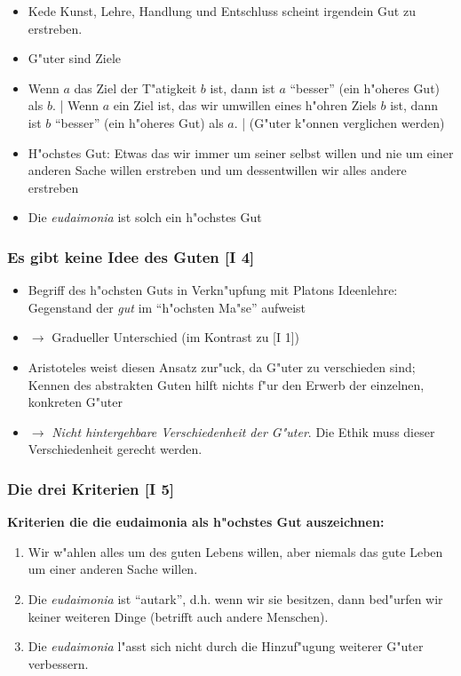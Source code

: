 \documentclass[emulatestandardclasses]{scrartcl}
\begin{document}
\begin{itemize}
  \item Kede Kunst, Lehre, Handlung und Entschluss scheint irgendein Gut zu erstreben.
  \item G"uter sind Ziele
  \item Wenn $a$ das Ziel der T"atigkeit $b$ ist, dann ist $a$ "`besser"' (ein h"oheres Gut) als $b$. | Wenn $a$ ein Ziel ist, das wir umwillen eines h"ohren Ziels $b$ ist, dann ist $b$ "`besser"' (ein h"oheres Gut) als $a$.  | (G"uter k"onnen verglichen werden)
  \item H"ochstes Gut: Etwas das wir immer um seiner selbst willen und nie um einer anderen Sache willen erstreben und um dessentwillen wir alles andere erstreben
  \item Die \emph{eudaimonia} ist solch ein h"ochstes Gut
\end{itemize}

\subsubsection{Es gibt keine Idee des Guten [I 4]}

\begin{itemize}
  \item Begriff des h"ochsten Guts in Verkn"upfung mit Platons Ideenlehre: Gegenstand der \emph{gut} im "`h"ochsten Ma"se"' aufweist
  \item $\rightarrow$ Gradueller Unterschied (im Kontrast zu [I 1])
  \item Aristoteles weist diesen Ansatz zur"uck, da G"uter zu verschieden sind; Kennen des abstrakten Guten hilft nichts f"ur den Erwerb der einzelnen, konkreten G"uter
  \item $\rightarrow$ \emph{Nicht hintergehbare Verschiedenheit der G"uter}. Die Ethik muss dieser Verschiedenheit gerecht werden.
\end{itemize}

\subsubsection{Die drei Kriterien [I 5]}

\noindent \textbf{Kriterien die die eudaimonia als h"ochstes Gut auszeichnen:}

\begin{enumerate}
  \item Wir w"ahlen alles um des guten Lebens willen, aber niemals das gute Leben um einer anderen Sache willen.
  \item Die \emph{eudaimonia} ist "`autark"', d.h. wenn wir sie besitzen, dann bed"urfen wir keiner weiteren Dinge (betrifft auch andere Menschen).
  \item Die \emph{eudaimonia} l"asst sich nicht durch die Hinzuf"ugung weiterer G"uter verbessern.
\end{enumerate}
\end{document}
